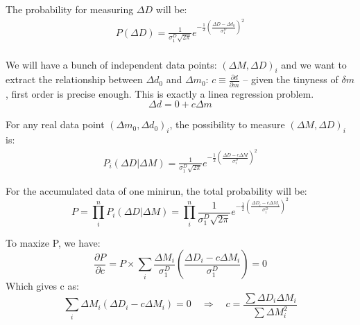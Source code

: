 The probability for measuring $\Delta D$ will be:
\begin{equation*}
    \begin{gathered}
	P(\Delta D) = \frac{1}{\sigma_1^D\sqrt{2\pi}} e^{-\frac{1}{2}\left( \frac{\Delta D - \Delta d_0}{\sigma_1^D}\right)^2}    \\
    \end{gathered}
\end{equation*}

We will have a bunch of independent data points: $(\Delta M, \Delta D)_i$ and 
we want to extract the relationship between $\Delta d_0$ and $\Delta m_0$: 
$c \equiv \frac{\partial d}{\partial m}$ -- given the tinyness of $\delta m$, first
order is precise enough. This is exactly a linea regression problem.
$$ \Delta d = 0 + c \Delta m $$

For any real data point $(\Delta m_0, \Delta d_0)_i$, the possibility to measure
$(\Delta M, \Delta D)_i$ is:
\begin{equation}
    \begin{gathered}
	P_i(\Delta D|\Delta M) = \frac{1}{\sigma_1^D\sqrt{2\pi}} 
	    e^{-\frac{1}{2}\left( \frac{\Delta D - c\Delta M}{\sigma_1^D}\right)^2}
    \end{gathered}
\end{equation}

For the accumulated data of one minirun, the total probability will be:
\begin{equation}
    P = \prod_i^n P_i(\Delta D|\Delta M) = \prod_i^n \frac{1}{\sigma_1^D\sqrt{2\pi}} 
	    e^{-\frac{1}{2}\left( \frac{\Delta D_i - c\Delta M_i}{\sigma_1^D}\right)^2}
\end{equation}

To maxize P, we have:
\begin{equation}
    \frac{\partial P}{\partial c} = P \times 
    \sum_i \frac{\Delta M_i}{\sigma_1^D} \left( \frac{\Delta D_i - c\Delta M_i}{\sigma_1^D}\right)
    = 0
\end{equation}
Which gives c as:
\begin{equation}
    \sum_i \Delta M_i (\Delta D_i - c\Delta M_i) = 0  \quad \Rightarrow \quad
    c = \frac{\sum \Delta D_i \Delta M_i}{\sum \Delta M^2_i}
\end{equation}

